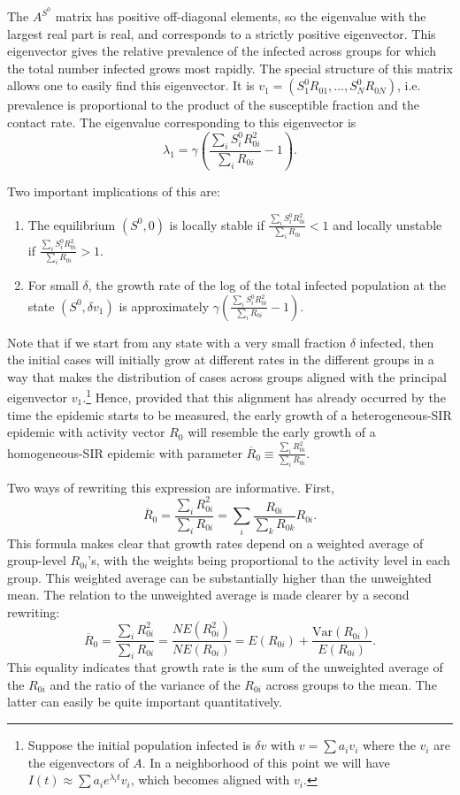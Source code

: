 \documentclass[11pt]{article}
\begin{document}
The $A^{S^0}$ matrix has positive off-diagonal elements, so the eigenvalue with the largest real part is real, and corresponds to a strictly positive
eigenvector. This eigenvector gives the relative prevalence of the infected across groups for which the total number infected grows most rapidly. 
The special structure of this matrix allows one to easily find this eigenvector. It is $v_1  = (S_1^0 R_{01}, \ldots, S^0_N  R_{0N})$, i.e. prevalence
is proportional to the product of the susceptible fraction and the contact rate. The eigenvalue corresponding to this eigenvector is
$$
\lambda_1 = \gamma \left(\frac{\sum_i S^0_i R_{0i}^2}{\sum_i R_{0i}} - 1\right).
$$

Two important implications of this are:

\begin{enumerate}
\item
The equilibrium $(S^0, 0)$ is locally stable if $\frac{\sum_i S^0_i R_{0i}^2}{\sum_i R_{0i}} < 1$ and locally unstable if 
$\frac{\sum_i S^0_i R_{0i}^2}{\sum_i R_{0i}} > 1.$

\item
For small $\delta$, the growth rate of the log of the total infected population at the state $(S^0, \delta v_1)$ is 
approximately $\gamma \left(\frac{\sum_i S^0_i R_{0i}^2}{\sum_i R_{0i}} - 1\right)$.
\end{enumerate}

Note that if we start from any state with a very small fraction $\delta$ infected, then the initial cases will initially grow at different rates in the different groups in a way that makes the distribution of cases across groups aligned with the principal eigenvector $v_1$.\footnote{Suppose the initial population infected
is $\delta v$ with $v = \sum a_i v_i$ where the $v_i$ are the eigenvectors of $A$.  In a neighborhood of this point we will have 
$I(t) \approx \sum a_i e^{\lambda_i t} v_i$, which becomes aligned with $v_i$.} Hence, provided that
this alignment has already occurred by the time the
epidemic starts to be measured, the early growth of
a heterogeneous-SIR epidemic with activity vector $R_{0}$ will resemble the early growth of a homogeneous-SIR epidemic with parameter
$\overline{R}_0 \equiv \frac{\sum_i R_{0i}^2}{\sum_i R_{0i}}$. 

Two ways of rewriting this expression are informative. First, 
$$
\overline{R}_0 = \frac{\sum_i R_{0i}^2}{\sum_i R_{0i}} = \sum_i \frac{R_{0i}}{\sum_k R_{0k}} R_{0i}. 
$$
This formula makes clear that growth rates depend on a weighted average of group-level $R_{0i}$'s, with the weights being proportional to the 
activity level in each group. This weighted average can be substantially higher than the unweighted mean. The relation to the unweighted average
is made clearer by a second rewriting:
$$
\overline{R}_0 =\frac{\sum_i R_{0i}^2}{\sum_i R_{0i}} = \frac{N E(R_{0i}^2)}{N E(R_{0i})} = E(R_{0i}) + \frac{\mbox{Var}(R_{0i})}{E(R_{0i})}. 
$$
This equality indicates that growth rate is the sum of the unweighted average of the $R_{0i}$ and the ratio of the variance of the $R_{0i}$ across groups to the mean. The latter can easily be quite important quantitatively. 
\end{document}
